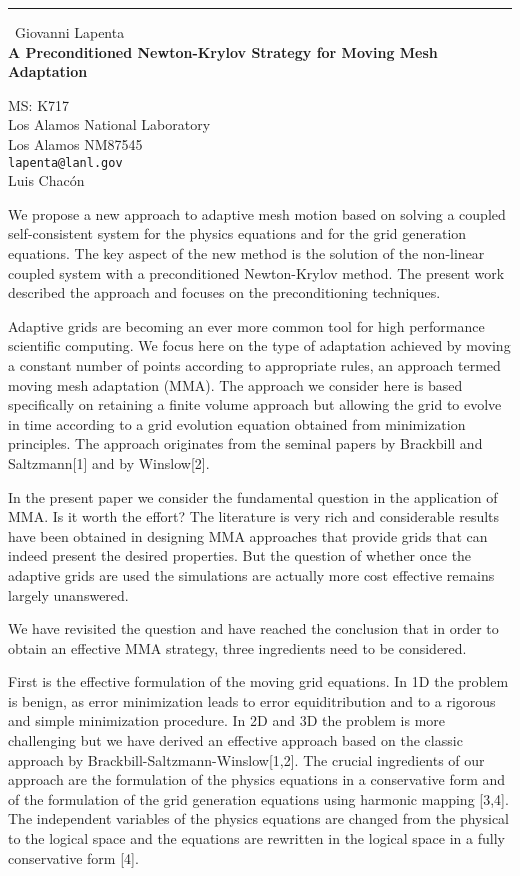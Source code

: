\documentclass{report}
\begin{document}
\begin{center}
\rule{6in}{1pt} \
{\large Giovanni Lapenta \\
{\bf A Preconditioned Newton-Krylov Strategy for Moving Mesh Adaptation}}

MS: K717 \\ Los Alamos National Laboratory \\ Los Alamos NM87545
\\
{\tt lapenta@lanl.gov}\\
Luis Chac\'on\end{center}

We propose a new approach to adaptive mesh motion based on solving a
coupled self-consistent system for the physics equations and for the
grid generation equations. The key aspect of the new method is the
solution of the non-linear coupled system with a preconditioned
Newton-Krylov method. The present work described the approach and
focuses on the preconditioning techniques.

Adaptive grids are becoming an ever more common tool for high
performance scientific computing. We focus here on the type of
adaptation achieved by moving a constant number of points according
to appropriate rules, an approach termed moving mesh adaptation
(MMA). The approach we consider here is based specifically on
retaining a finite volume approach but allowing the grid to evolve
in time according to a grid evolution equation obtained from
minimization principles. The approach originates from the seminal
papers by Brackbill and Saltzmann[1] and by Winslow[2].

In the present paper we consider the fundamental question in the application
of MMA. Is it worth the effort? The literature is very rich and considerable
results have been obtained in designing MMA approaches that provide
grids that can indeed present the desired properties. But the question
of whether once the adaptive grids are used the simulations are actually
more cost effective remains largely unanswered.

We have revisited the question and have reached the conclusion that
in order to obtain an effective MMA strategy, three ingredients need
to be considered.

First is the effective formulation of the moving grid equations. In
1D the problem is benign, as error minimization leads to error
equiditribution and to a rigorous and simple minimization procedure.
In 2D and 3D the problem is more challenging but we have derived an
effective approach based on the classic approach by
Brackbill-Saltzmann-Winslow[1,2]. The crucial ingredients of our
approach are the formulation of the physics equations in a
conservative form and of the formulation of the grid generation
equations using harmonic mapping [3,4]. The independent variables of
the physics equations are changed from the physical to the logical
space and the equations are rewritten in the logical space in a
fully conservative form [4].
\end{document}
